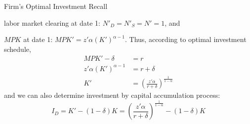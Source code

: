 \documentclass[11pt,aspectratio=169,usenames,dvipsnames]{beamer}
\let\tempone\itemize
\let\temptwo\enditemize
\renewenvironment{itemize}{\tempone\addtolength{\itemsep}{\fill}}{\temptwo}
\begin{document}
\begin{frame}{Firm's Optimal Investment}
\label{slide:Firm_s_Optimal_Investment}
    Recall
    \begin{itemize}
        \item labor market clearing at date 1: $ N'_{D} = N'_{S} = N' = 1 $, and
        \item $ MPK $ at date 1: $ MPK' = z' \alpha ( K' )^{\alpha-1}$.
    \end{itemize}
    Thus, according to optimal investment schedule,
    \begin{align*}
        MPK' - \delta
            &= r
        \\
        z' \alpha ( K' )^{\alpha-1}
            &=  r + \delta
        \\
        K'
            &= \left(
                \frac{z' \alpha}{r+\delta}
            \right)^{\frac{1}{1-\alpha}}
    \end{align*}
    and we can also determine investment by capital accumulation process:
    \begin{equation*}
        I_{D} = K' - ( 1-\delta)K
          = \left(
                \frac{z' \alpha}{r+\delta}
            \right)^{\frac{1}{1-\alpha}}
            - ( 1-\delta )K
    \end{equation*}
\end{frame}
\end{document}
